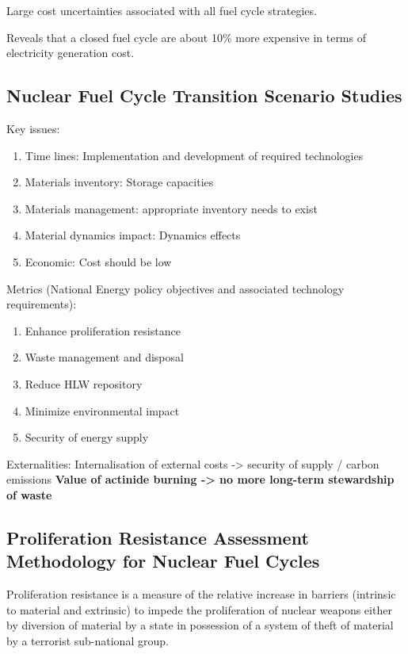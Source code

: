 Large cost uncertainties associated with all fuel cycle strategies.

Reveals that a closed fuel cycle are about 10\% more expensive in terms of 
electricity generation cost.


\subsection{Nuclear Fuel Cycle Transition Scenario Studies}
\cite{oecd_nuclear_2009}

Key issues:
\begin{enumerate}
    \item Time lines: Implementation and development of required technologies
    \item Materials inventory: Storage capacities
    \item Materials management: appropriate inventory needs to exist
    \item Material dynamics impact: Dynamics effects
    \item Economic: Cost should be low
\end{enumerate}


Metrics (National Energy policy objectives and associated technology requirements):
\begin{enumerate}
    \item Enhance proliferation resistance
    \item Waste management and disposal
    \item Reduce HLW repository
    \item Minimize environmental impact
    \item Security of energy supply
\end{enumerate}


Externalities:
Internalisation of external costs -> security of supply / carbon emissions
\textbf{Value of actinide burning -> no more long-term stewardship of waste}


\subsection{Proliferation Resistance Assessment Methodology for Nuclear Fuel Cycles}
\cite{charlton_proliferation_2007}

Proliferation resistance is a measure of the relative increase in barriers 
(intrinsic to material and extrinsic) to impede the proliferation of nuclear weapons
either by diversion of material by a state in possession of a system of theft
of material by a terrorist sub-national group.

